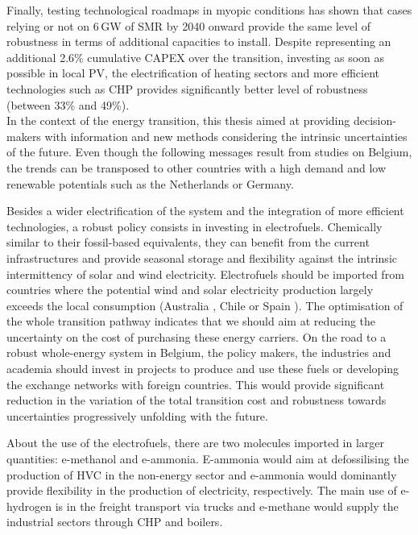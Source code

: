 Finally, testing technological roadmaps in myopic conditions has shown that cases relying or not on 6\,GW of \gls{SMR} by 2040 onward provide the same level of robustness in terms of additional capacities to install. Despite representing an additional 2.6\% cumulative CAPEX over the transition, investing as soon as possible in local \gls{PV}, the electrification of heating sectors and more efficient technologies such as \gls{CHP} provides significantly better level of robustness (between 33\% and 49\%).\\


In the context of the energy transition, this thesis aimed at providing decision-makers with information and new methods considering the intrinsic uncertainties of the future. Even though the following messages result from studies on Belgium, the trends can be transposed to other countries with a high demand and low renewable potentials such as the Netherlands or Germany. 

Besides a wider electrification of the system and the integration of more efficient technologies, a robust policy consists in investing in electrofuels. Chemically similar to their fossil-based equivalents, they can benefit from the current infrastructures and provide seasonal storage and flexibility against the intrinsic intermittency of solar and wind electricity. Electrofuels should be imported from countries where the potential wind and solar electricity production largely exceeds the local consumption (Australia \cite{Australia_efuels}, Chile \cite{Chile_efuels} or Spain \cite{Spain_efuels}). The optimisation of the whole transition pathway indicates that we should aim at reducing the uncertainty on the cost of purchasing these energy carriers. On the road to a robust whole-energy system in Belgium, the policy makers, the industries and academia should invest in projects to produce and use these fuels or developing the exchange networks with foreign countries. This would provide significant reduction in the variation of the total transition cost and robustness towards uncertainties progressively unfolding with the future. 

About the use of the electrofuels, there are two molecules imported in larger quantities: e-methanol and e-ammonia. E-ammonia would aim at defossilising the production of \acrfull{HVC} in the non-energy sector and e-ammonia would dominantly provide flexibility in the production of electricity, respectively. The main use of e-hydrogen is in the freight transport via trucks and e-methane would supply the industrial sectors through \gls{CHP} and boilers.

